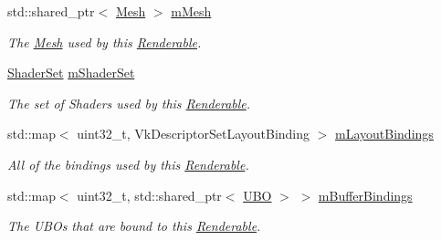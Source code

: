 \begin{DoxyCompactItemize}
\item 
\mbox{\label{class_renderable_a2fdfa7906e3b3a25adcff5ed4d2bbb59}} 
std\+::shared\+\_\+ptr$<$ \mbox{\hyperlink{class_mesh}{Mesh}} $>$ \mbox{\hyperlink{class_renderable_a2fdfa7906e3b3a25adcff5ed4d2bbb59}{m\+Mesh}}
\begin{DoxyCompactList}\small\item\em The \mbox{\hyperlink{class_mesh}{Mesh}} used by this \mbox{\hyperlink{class_renderable}{Renderable}}. \end{DoxyCompactList}\item 
\mbox{\label{class_renderable_afdc9b05130a28a7b0cc4ad95c5168603}} 
\mbox{\hyperlink{struct_shader_set}{Shader\+Set}} \mbox{\hyperlink{class_renderable_afdc9b05130a28a7b0cc4ad95c5168603}{m\+Shader\+Set}}
\begin{DoxyCompactList}\small\item\em The set of Shaders used by this \mbox{\hyperlink{class_renderable}{Renderable}}. \end{DoxyCompactList}\item 
\mbox{\label{class_renderable_af5661d4019275a8992afd8b8009444fc}} 
std\+::map$<$ uint32\+\_\+t, Vk\+Descriptor\+Set\+Layout\+Binding $>$ \mbox{\hyperlink{class_renderable_af5661d4019275a8992afd8b8009444fc}{m\+Layout\+Bindings}}
\begin{DoxyCompactList}\small\item\em All of the bindings used by this \mbox{\hyperlink{class_renderable}{Renderable}}. \end{DoxyCompactList}\item 
\mbox{\label{class_renderable_a35131c5fcc3d5e2f4340895f01ee642c}} 
std\+::map$<$ uint32\+\_\+t, std\+::shared\+\_\+ptr$<$ \mbox{\hyperlink{struct_u_b_o}{U\+BO}} $>$ $>$ \mbox{\hyperlink{class_renderable_a35131c5fcc3d5e2f4340895f01ee642c}{m\+Buffer\+Bindings}}
\begin{DoxyCompactList}\small\item\em The U\+B\+Os that are bound to this \mbox{\hyperlink{class_renderable}{Renderable}}. \end{DoxyCompactList}\item 
\mbox{\label{class_renderable_a64794aa77cfcc47cac762d34ec3af309}} 

\end{DoxyCompactItemize}
